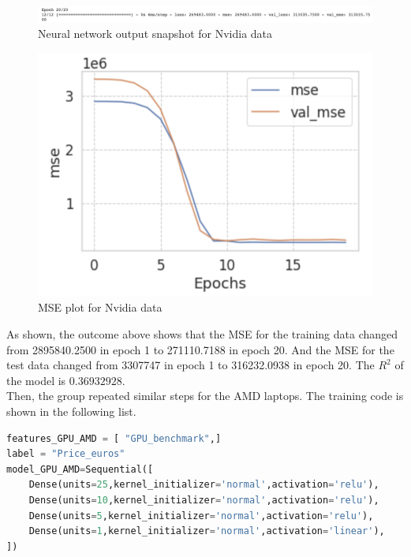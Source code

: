 \documentclass{scrartcl}
\begin{document}
\begin{figure}[H]
         \centering
         \includegraphics[width=\textwidth]{Graphics/Neural Network Images/NN13.png}
         \caption{Neural network output snapshot for Nvidia data}
         \label{fig:NN12-13}
\end{figure}

\begin{figure}[H]
	\begin{center}
		\includegraphics[scale=1.0]{Graphics/Neural Network Images/NN11.png}
    \caption{MSE plot for Nvidia data}
	\end{center}
	\label{fig:net2}
\end{figure}

\noindent As shown, the outcome above shows that the MSE for the training data changed from 2895840.2500 in epoch 1 to 271110.7188 in epoch 20. And the MSE for the test data changed from 3307747 in epoch 1 to 316232.0938 in epoch 20. The $R^2$ of the model is $0.36932928$.\\





\noindent Then, the group repeated similar steps for the AMD laptops. The training code is shown in the following list. 

\begin{lstlisting}[language=Python, caption= Code for training AMD data, basicstyle=\tiny,captionpos=b]
features_GPU_AMD = [ "GPU_benchmark",]
label = "Price_euros"
model_GPU_AMD=Sequential([
    Dense(units=25,kernel_initializer='normal',activation='relu'),
    Dense(units=10,kernel_initializer='normal',activation='relu'),
    Dense(units=5,kernel_initializer='normal',activation='relu'),
    Dense(units=1,kernel_initializer='normal',activation='linear'),
])
\end{lstlisting}
\end{document}
